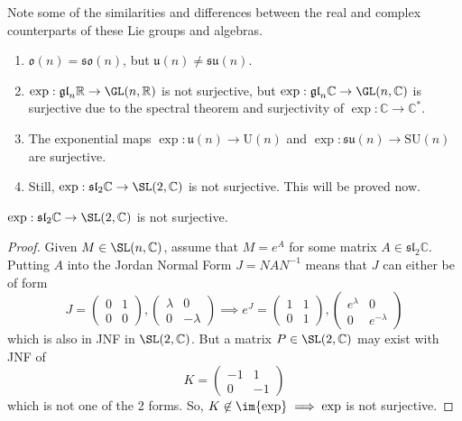   Note some of the similarities and differences between the real and complex counterparts of these Lie groups and algebras. 
  \begin{enumerate}
    \item $\mathfrak{o}(n) = \mathfrak{so}(n)$, but $\mathfrak{u}(n) \neq \mathfrak{su}(n)$. 
    \item $\exp: \mathfrak{gl}_n \mathbb{R} \rightarrow \GL(n, \mathbb{R})$ is not surjective, but $\exp: \mathfrak{gl}_n \mathbb{C} \rightarrow \GL(n, \mathbb{C})$ is surjective due to the spectral theorem and surjectivity of $\exp: \mathbb{C} \rightarrow \mathbb{C}^*$.
    \item The exponential maps $\exp: \mathfrak{u}(n) \rightarrow \text{U}(n)$ and $\exp: \mathfrak{su}(n) \rightarrow \text{SU}(n)$ are surjective. 
    \item Still, $\exp: \mathfrak{sl}_2 \mathbb{C} \rightarrow \SL(2, \mathbb{C})$ is not surjective. This will be proved now. 
  \end{enumerate}

  \begin{theorem}
    \label{thm:non-surjectivity-of-exp-on-mathfraksl2c}
    $\exp: \mathfrak{sl}_2 \mathbb{C} \rightarrow \SL(2, \mathbb{C})$ is not surjective. 
  \end{theorem}
  \begin{proof}
    Given $M \in \SL(n, \mathbb{C})$, assume that $M = e^A$ for some matrix $A \in \mathfrak{sl}_2 \mathbb{C}$. Putting $A$ into the Jordan Normal Form $J = N A N^{-1}$ means that $J$ can either be of form
    \begin{equation}
      J = \begin{pmatrix}
      0&1\\0&0
      \end{pmatrix}, \begin{pmatrix}
      \lambda&0\\0&-\lambda
      \end{pmatrix} \implies e^J = \begin{pmatrix}
      1&1\\0&1
      \end{pmatrix}, \begin{pmatrix}
      e^\lambda&0\\0&e^{-\lambda}
      \end{pmatrix}
    \end{equation}
    which is also in JNF in $\SL(2, \mathbb{C})$. But a matrix $P \in \SL(2, \mathbb{C})$ may exist with JNF of 
    \begin{equation}
      K = \begin{pmatrix}
      -1&1\\0&-1
      \end{pmatrix}
    \end{equation}
    which is not one of the 2 forms. So, $K \not\in \im{\exp} \implies \exp$ is not surjective. 
  \end{proof}

